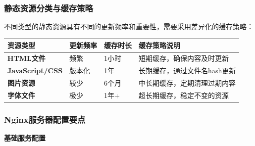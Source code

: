\subsubsection{静态资源分类与缓存策略}\label{ux9759ux6001ux8d44ux6e90ux5206ux7c7bux4e0eux7f13ux5b58ux7b56ux7565}

不同类型的静态资源具有不同的更新频率和重要性，需要采用差异化的缓存策略：

\begin{longtable}[]{@{}llll@{}}
\toprule\noalign{}
资源类型 & 更新频率 & 缓存时长 & 缓存策略说明 \\
\midrule\noalign{}
\endhead
\bottomrule\noalign{}
\endlastfoot
\textbf{HTML文件} & 频繁 & 1小时 & 短期缓存，确保内容及时更新 \\
\textbf{JavaScript/CSS} & 版本化 & 1年 & 长期缓存，通过文件名hash更新 \\
\textbf{图片资源} & 较少 & 6个月 & 中长期缓存，定期清理过期内容 \\
\textbf{字体文件} & 极少 & 1年+ & 超长期缓存，稳定不变的资源 \\
\end{longtable}

\subsubsection{Nginx服务器配置要点}\label{nginxux670dux52a1ux5668ux914dux7f6eux8981ux70b9}

\textbf{基础服务配置}

\begin{Shaded}
\begin{Highlighting}[]
    
    
    
    
\NormalTok{    \}}
\NormalTok{\}}
\end{Highlighting}
\end{Shaded}


